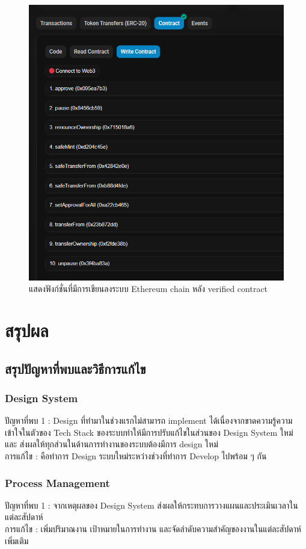 \documentclass[12pt,oneside,openright,a4paper]{cpe-thai-project}
\begin{document}
\begin{figure}[!thb]
			\centering
			\includegraphics[scale=0.5]{etherscanWrite}
			\caption{แสดงฟังก์ชั่นที่มีการเขียนลงระบบ Ethereum chain หลัง verified contract}
		\end{figure}
\chapter{สรุปผล}
\section{ สรุปปัญหาที่พบและวิธีการแก้ไข}
\subsection{Design System}
\tab ปัญหาที่พบ 1 : Design ที่ทำมาในช่วงแรกไม่สามารถ implement ได้เนื่องจากขาดความรู้ความเข้าใจในตัวของ Tech Stack ของระบบทำให้มีการปรับแก้ไขในส่วนของ Design System ใหม่ และ ส่งผลให้ทุกส่วนในด้านการทำงานของระบบต้องมีการ design ใหม่\\
\tab การแก้ไข : คือทำการ Design ระบบใหม่ระหว่างช่วงที่ทำการ Develop ไปพร้อม ๆ กัน\\

\subsection{Process Management}
\tab ปัญหาที่พบ 1 : จากเหตุผลของ Design System ส่งผลให้กระทบการวางแผนและประเมินเวลาในแต่ละสัปดาห์ \\
\tab การแก้ไข : เพิ่มปริมาณงาน เป้าหมายในการทำงาน และจัดลำดับความสำคัญของงานในแต่ละสัปดาห์เพิ่มเติม \\
\end{document}
